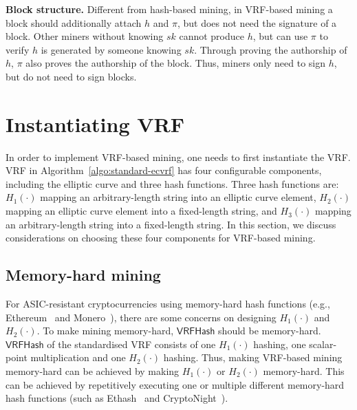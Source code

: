 \documentclass[a0,portrait]{a0poster}
\begin{document}
\begin{multicols}{2}
\textbf{Block structure.}
Different from hash-based mining, in VRF-based mining a block should additionally attach $h$ and $\pi$, but does not need the signature of a block.
Other miners without knowing $sk$ cannot produce $h$, but can use $\pi$ to verify $h$ is generated by someone knowing $sk$.
Through proving the authorship of $h$, $\pi$ also proves the authorship of the block.
Thus, miners only need to sign $h$, but do not need to sign blocks.


\section*{Instantiating VRF}

In order to implement VRF-based mining, one needs to first instantiate the VRF.
VRF in Algorithm~\ref{algo:standard-ecvrf} has four configurable components, including the elliptic curve and three hash functions.
Three hash functions are:
$H_{1}(\cdot)$ mapping an arbitrary-length string into an elliptic curve element,
$H_{2}(\cdot)$ mapping an elliptic curve element into a fixed-length string, and
$H_{3}(\cdot)$ mapping an arbitrary-length string into a fixed-length string.
In this section, we discuss considerations on choosing these four components for VRF-based mining.

\subsection{Memory-hard mining}

For ASIC-resistant cryptocurrencies using memory-hard hash functions (e.g., Ethereum~\cite{wood2014ethereum} and Monero~\cite{monero}), there are some concerns on designing $H_{1}(\cdot)$ and $H_{2}(\cdot)$.
To make mining memory-hard, $\mathsf{VRFHash}$ should be memory-hard.
$\mathsf{VRFHash}$ of the standardised VRF consists of one $H_{1}(\cdot)$ hashing, one scalar-point multiplication and one $H_{2}(\cdot)$ hashing.
Thus, making VRF-based mining memory-hard can be achieved by making $H_{1}(\cdot)$ or $H_{2}(\cdot)$ memory-hard.
This can be achieved by repetitively executing one or multiple different memory-hard hash functions (such as Ethash~\cite{wiki2017ethash} and CryptoNight~\cite{seigenneocortex}).



\end{multicols}
\end{document}
